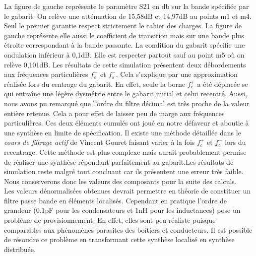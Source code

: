 \documentclass[french]{article}
\begin{document}
La figure de gauche représente le paramètre S21 en db sur la bande spécifiée par le gabarit. On relève une atténuation de 15,58dB et 14,97dB au points m1 et m4. Seul le premier garantie respect strictement le cahier des charges. La figure de gauche représente elle aussi le coefficient de transition mais sur une bande plus étroite correspondant à la bande passante. La condition du gabarit spécifie une ondulation inférieur à 0,1dB. Elle est respecter partout sauf au point m5 où on relève 0,101dB. Les résultats de cette simulation présentent deux débordements aux fréquences particulières $f_c^-$ et $f_s^-$. Cela s'explique par une approximation réalisée lors du centrage du gabarit. En effet, seule la borne $f_c^+$ a été déplacée se qui entraîne une légère dysmétrie entre le gabarit initial et celui recentré. Aussi, nous avons pu remarqué que l'ordre du filtre décimal est très proche de la valeur entière retenue. Cela a pour effet de laisser peu de marge aux fréquences particulières. Ces deux éléments cumulés ont joué en notre défaveur et aboutie à une synthèse en limite de spécification. 
Il existe une méthode détaillée dans le \textit{cours de filtrage actif} de Vincent Gouret faisant varier à la fois $f_c^+$ et $f_c^-$ lors du recentrage. Cette méthode est plus complexe mais aurait probablement permise de réaliser une synthèse répondant parfaitement au gabarit.Les résultats de simulation reste malgré tout concluant car ils présentent une erreur très faible. Nous conserverons donc les valeurs des composants pour la suite des calculs.\\

Les valeurs dénormalisées obtenues devrait permettre en théorie de constituer un filtre passe bande en éléments localisés. Cependant en pratique l'ordre de grandeur (0,1pF pour les condensateurs et 1nH pour les inductances) pose un problème de provisionnement. En effet, elles sont peu réaliste puisque comparables aux phénomènes parasites des boîtiers et conducteurs. Il est possible de résoudre ce problème en transformant cette synthèse localisé en synthèse distribuée.
\end{document}
